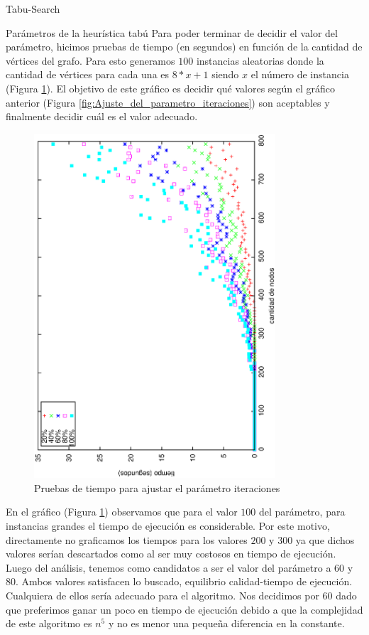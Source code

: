 \begin{section}{Tabu-Search}
\begin{subsection}{Parámetros de la heurística tabú}
	Para poder terminar de decidir el valor del parámetro, hicimos pruebas de tiempo (en segundos) en función de la cantidad de vértices del grafo. Para esto generamos $100$ instancias aleatorias donde la cantidad de vértices para cada una es $8*x+1$ siendo $x$ el número de instancia (Figura \ref{fig:Ajuste_del_parametro_iteraciones2}). El objetivo de este gráfico es decidir qué valores según el gráfico anterior (Figura \ref{fig:Ajuste_del_parametro_iteraciones}) son aceptables y finalmente decidir cuál es el valor adecuado.

	\begin{figure}[H]
		\centering
		    	\includegraphics[width=9cm,angle=-90]{tabu_search/time.eps}
		\caption{Pruebas de tiempo para ajustar el parámetro iteraciones}
		\label{fig:Ajuste_del_parametro_iteraciones2}
	\end{figure}
	
	En el gráfico (Figura \ref{fig:Ajuste_del_parametro_iteraciones2}) observamos que para el valor $100$ del parámetro, para instancias grandes el tiempo de ejecución es considerable. Por este motivo, directamente no graficamos los tiempos para los valores $200$ y $300$ ya que dichos valores serían descartados como al ser muy costosos en tiempo de ejecución.
	Luego del análisis, tenemos como candidatos a ser el valor del parámetro a $60$ y $80$. Ambos valores satisfacen lo buscado, equilibrio calidad-tiempo de ejecución. Cualquiera de ellos sería adecuado para el algoritmo. Nos decidimos por $60$ dado que preferimos ganar un poco en tiempo de ejecución debido a que la complejidad de este algoritmo es $n^5$ y no es menor una pequeña diferencia en la constante.\VSP



\end{subsection}
\end{section}
